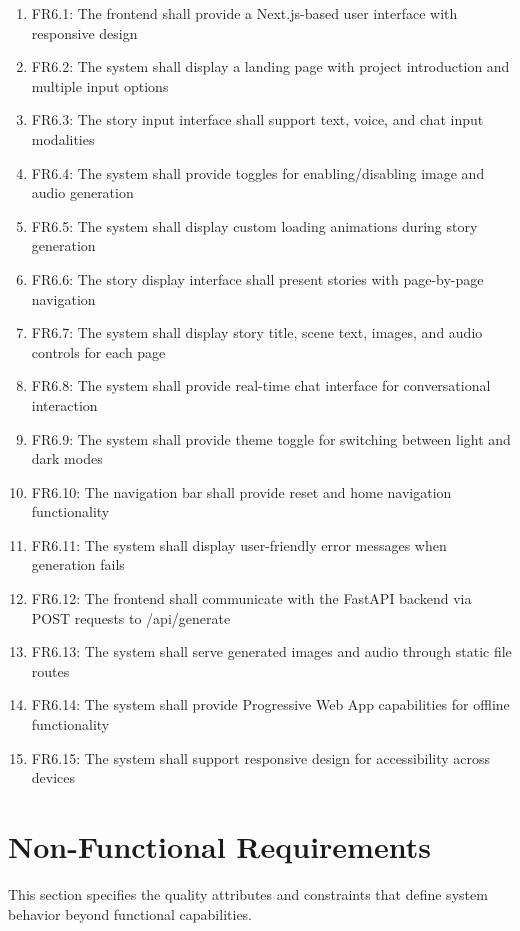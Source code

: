 \begin{enumerate}
    \item FR6.1: The frontend shall provide a Next.js-based user interface with responsive design
    \item FR6.2: The system shall display a landing page with project introduction and multiple input options
    \item FR6.3: The story input interface shall support text, voice, and chat input modalities
    \item FR6.4: The system shall provide toggles for enabling/disabling image and audio generation
    \item FR6.5: The system shall display custom loading animations during story generation
    \item FR6.6: The story display interface shall present stories with page-by-page navigation
    \item FR6.7: The system shall display story title, scene text, images, and audio controls for each page
    \item FR6.8: The system shall provide real-time chat interface for conversational interaction
    \item FR6.9: The system shall provide theme toggle for switching between light and dark modes
    \item FR6.10: The navigation bar shall provide reset and home navigation functionality
    \item FR6.11: The system shall display user-friendly error messages when generation fails
    \item FR6.12: The frontend shall communicate with the FastAPI backend via POST requests to /api/generate
    \item FR6.13: The system shall serve generated images and audio through static file routes
    \item FR6.14: The system shall provide Progressive Web App capabilities for offline functionality
    \item FR6.15: The system shall support responsive design for accessibility across devices
\end{enumerate}

\section{Non-Functional Requirements}

This section specifies the quality attributes and constraints that define system behavior beyond functional capabilities.

